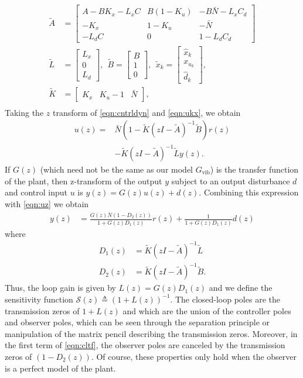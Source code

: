 \documentclass[twocolumn,twoside]{IEEEtran}
\newcommand{\Gv}{\ensuremath{G_{\text{vib}}}\xspace}
\begin{document}
\begin{align*}
  \tilde{A} &= \begin{bmatrix}
    A-BK_x-L_xC & B(1-K_u) & -B\bar{N} - L_xC_d\\
    -K_x        & 1-K_u    & -\bar{N} \\
    -L_dC      & 0        & 1-L_dC_d
  \end{bmatrix}\\
  \tilde{L} &= \begin{bmatrix} L_x \\ 0 \\ L_d  \end{bmatrix},\:\:
  \tilde{B} = \begin{bmatrix} B \\ 1 \\0\end{bmatrix},\:\:
  \tilde{x}_k = \begin{bmatrix} \hat{x}_k \\ x_{u_k} \\ \hat{d}_k\end{bmatrix},\\
  \tilde{K} &= \begin{bmatrix}K_x & K_u-1 & \bar{N}\end{bmatrix},\\
\end{align*}
Taking the $z$ transform of \eqref{eqn:cntrldyn} and \eqref{eqn:ukx}, we obtain
\begin{align}
  u(z) =&  \bar{N}(1-\tilde{K}(zI-\tilde{A})^{-1}\tilde{B})r(z) \label{eqn:uz}\\
       & -\tilde{K}(zI - \tilde{A})^{-1}\tilde{L}y(z).\nonumber
\end{align}
If $G(z)$ (which need not be the same as our model $\Gv$) is the transfer function of the plant, then z-transform of the output $y$ subject to an output disturbance $d$ and control input $u$ is $y(z) = G(z)u(z) + d(z)$. Combining this expression with \eqref{eqn:uz} we obtain 
\begin{align}
  y(z) &= \frac{G(z)\bar{N}(1-D_2(z))}{1 + G(z)D_1(z)} r(z) + \frac{1}{1 + G(z)D_1(z)}d(z)\label{eqn:cltf}
\end{align}
where
\begin{align}
  D_1(z) &= \tilde{K}(zI -\tilde{A})^{-1}\tilde{L}\\
  D_2(z) &= \tilde{K}(zI -\tilde{A})^{-1}\tilde{B}.
\end{align}
Thus, the loop gain is given by $L(z) = G(z)D_1(z)$ and we define the sensitivity function $\mathcal{S}(z)\triangleq (1+L(z))^{-1}$. The closed-loop poles are the transmission zeros of $1+L(z)$ and which are the union of the controller poles and observer poles, which can be seen through the separation principle or manipulation of the matrix pencil describing the transmission zeros. Moreover, in the first term of \eqref{eqn:cltf}, the observer poles are canceled by the transmission zeros of $(1-D_2(z))$. Of course, these properties only hold when the observer is a perfect model of the plant. 
\end{document}
